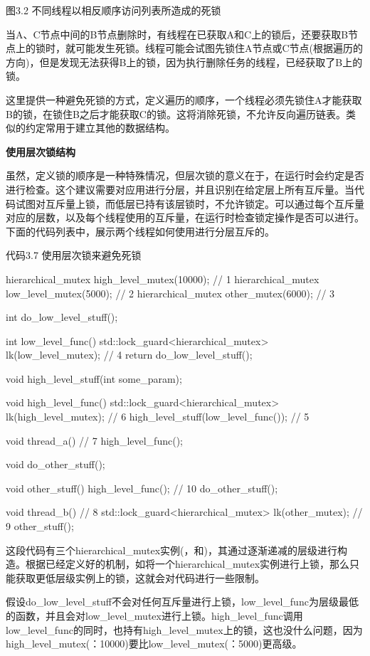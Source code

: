 图3.2 不同线程以相反顺序访问列表所造成的死锁

当A、C节点中间的B节点删除时，有线程在已获取A和C上的锁后，还要获取B节点上的锁时，就可能发生死锁。线程可能会试图先锁住A节点或C节点(根据遍历的方向)，但是发现无法获得B上的锁，因为执行删除任务的线程，已经获取了B上的锁。

这里提供一种避免死锁的方式，定义遍历的顺序，一个线程必须先锁住A才能获取B的锁，在锁住B之后才能获取C的锁。这将消除死锁，不允许反向遍历链表。类似的约定常用于建立其他的数据结构。

\textbf{使用层次锁结构}

虽然，定义锁的顺序是一种特殊情况，但层次锁的意义在于，在运行时会约定是否进行检查。这个建议需要对应用进行分层，并且识别在给定层上所有互斥量。当代码试图对互斥量上锁，而低层已持有该层锁时，不允许锁定。可以通过每个互斥量对应的层数，以及每个线程使用的互斥量，在运行时检查锁定操作是否可以进行。下面的代码列表中，展示两个线程如何使用进行分层互斥的。

代码3.7 使用层次锁来避免死锁

\begin{cpp}
hierarchical_mutex high_level_mutex(10000); // 1
hierarchical_mutex low_level_mutex(5000);  // 2
hierarchical_mutex other_mutex(6000); // 3

int do_low_level_stuff();

int low_level_func()
{
  std::lock_guard<hierarchical_mutex> lk(low_level_mutex); // 4
  return do_low_level_stuff();
}

void high_level_stuff(int some_param);

void high_level_func()
{
  std::lock_guard<hierarchical_mutex> lk(high_level_mutex); // 6
  high_level_stuff(low_level_func()); // 5
}

void thread_a()  // 7
{
  high_level_func();
}

void do_other_stuff();

void other_stuff()
{
  high_level_func();  // 10
  do_other_stuff();
}

void thread_b() // 8
{
  std::lock_guard<hierarchical_mutex> lk(other_mutex); // 9
  other_stuff();
}
\end{cpp}

这段代码有三个hierarchical\_mutex实例(，和)，其通过逐渐递减的层级进行构造。根据已经定义好的机制，如将一个hierarchical\_mutex实例进行上锁，那么只能获取更低层级实例上的锁，这就会对代码进行一些限制。

假设do\_low\_level\_stuff不会对任何互斥量进行上锁，low\_level\_func为层级最低的函数，并且会对low\_level\_mutex进行上锁。high\_level\_func调用low\_level\_func的同时，也持有high\_level\_mutex上的锁，这也没什么问题，因为high\_level\_mutex(：10000)要比low\_level\_mutex(：5000)更高级。

